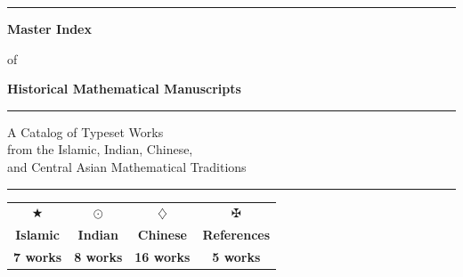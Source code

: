 \documentclass[11pt,a4paper]{article}
\begin{document}
\begin{titlepage}
  \begin{center}
    \vspace*{1.5cm}
    
    {\color{goldaccent}\rule{\textwidth}{1.5pt}}
    
    \vspace{1.5cm}
    
    {\fontsize{32}{38}\selectfont\bfseries\color{titlecolor} Master Index}
    
    \vspace{0.8cm}
    
    {\fontsize{16}{20}\selectfont\color{sectioncolor} of}
    
    \vspace{0.8cm}
    
    {\fontsize{28}{34}\selectfont\bfseries\color{titlecolor} Historical Mathematical Manuscripts}
    
    \vspace{2cm}
    
    {\color{goldaccent}\rule{0.6\textwidth}{0.8pt}}
    
    \vspace{1.5cm}
    
    {\Large\color{sectioncolor}
    A Catalog of Typeset Works\\[0.3em]
    from the Islamic, Indian, Chinese,\\[0.3em]
    and Central Asian Mathematical Traditions
    }
    
    \vspace{2cm}
    
    {\color{goldaccent}\rule{0.6\textwidth}{0.8pt}}
    
    \vspace{2cm}
    
    \begin{tabular}{cccc}
      \textcolor{islamiccolor}{$\bigstar$} &
      \textcolor{indiancolor}{$\odot$} &
      \textcolor{chinesecolor}{$\diamondsuit$} &
      \textcolor{refcolor}{$\maltese$}
    \\
      \textbf{Islamic} & \textbf{Indian} & \textbf{Chinese} & \textbf{References}
    \\
      \textbf{7 works} & \textbf{8 works} & \textbf{16 works} & \textbf{5 works}
    \\
    \end{tabular}
    

\end{center}
\end{titlepage}
\end{document}

